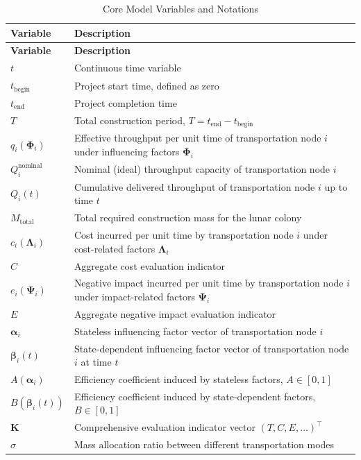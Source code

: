 \documentclass[12pt]{article}
\begin{document}
\begin{longtable}{p{3.8cm} p{10.2cm}}
\caption{Core Model Variables and Notations} \\
\hline
\textbf{Variable} & \textbf{Description} \\
\hline
\endfirsthead

\hline
\textbf{Variable} & \textbf{Description} \\
\hline
\endhead

\hline
\endfoot

\hline
\endlastfoot

$t$ & Continuous time variable \\

$t_{\text{begin}}$ & Project start time, defined as zero \\
$t_{\text{end}}$ & Project completion time \\
$T$ & Total construction period, $T = t_{\text{end}} - t_{\text{begin}}$ \\

$q_i(\boldsymbol{\Phi}_i)$ & Effective throughput per unit time of transportation node $i$ under influencing factors $\boldsymbol{\Phi}_i$ \\
$Q_i^{\text{nominal}}$ & Nominal (ideal) throughput capacity of transportation node $i$ \\
$Q_i(t)$ & Cumulative delivered throughput of transportation node $i$ up to time $t$ \\

$M_{\text{total}}$ & Total required construction mass for the lunar colony \\

$c_i(\boldsymbol{\Lambda}_i)$ & Cost incurred per unit time by transportation node $i$ under cost-related factors $\boldsymbol{\Lambda}_i$ \\
$C$ & Aggregate cost evaluation indicator \\

$e_i(\boldsymbol{\Psi}_i)$ & Negative impact incurred per unit time by transportation node $i$ under impact-related factors $\boldsymbol{\Psi}_i$ \\
$E$ & Aggregate negative impact evaluation indicator \\

$\boldsymbol{\alpha}_i$ & Stateless influencing factor vector of transportation node $i$ \\
$\boldsymbol{\beta}_i(t)$ & State-dependent influencing factor vector of transportation node $i$ at time $t$ \\
$A(\boldsymbol{\alpha}_i)$ & Efficiency coefficient induced by stateless factors, $A \in [0,1]$ \\
$B(\boldsymbol{\beta}_i(t))$ & Efficiency coefficient induced by state-dependent factors, $B \in [0,1]$ \\

$\boldsymbol{K}$ & Comprehensive evaluation indicator vector $(T, C, E, \ldots)^\top$ \\

$\sigma$ & Mass allocation ratio between different transportation modes \\

\end{longtable}
\end{document}
